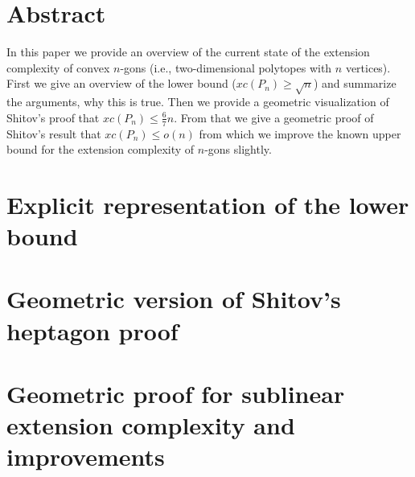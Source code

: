 \documentclass[12pt,a4paper,twoside]{article}
\begin{document}
\newpage
\tableofcontents
\newpage

\pagestyle{headings}

\section*{Abstract}
In this paper we provide an overview of the current state of the extension complexity of convex $n$-gons (i.e., two-dimensional polytopes with $n$ vertices). First we give an overview of the lower bound  ($xc(P_n) \geq \sqrt{n}$) and summarize the arguments, why this is true. Then we provide a geometric visualization of Shitov's proof that $xc(P_n) \leq \frac{6}{7}n$. From that we give a geometric proof of Shitov's result that $xc(P_n) \leq o(n)$ from which we improve the known upper bound for the extension complexity of $n$-gons slightly.

\section{Explicit representation of the lower bound}

\section{Geometric version of Shitov's heptagon proof}

\section{Geometric proof for sublinear extension complexity and improvements}





\cite{Padrol}
\cite{HiddenVertices}
\cite{UpperBound}
\cite{Sublinear}



\end{document}
